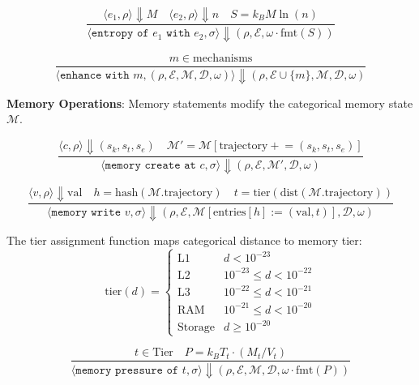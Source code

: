 \documentclass[twocolumn,10pt]{article}
\begin{document}
\begin{equation}
    \frac{\langle e_1, \rho \rangle \Downarrow M \quad \langle e_2, \rho \rangle \Downarrow n \quad S = k_B M \ln(n)}{\langle \texttt{entropy of } e_1 \texttt{ with } e_2, \sigma \rangle \Downarrow (\rho, \mathcal{E}, \omega \cdot \text{fmt}(S))}
\end{equation}

\begin{equation}
    \frac{m \in \text{mechanisms}}{\langle \texttt{enhance with } m, (\rho, \mathcal{E}, \mathcal{M}, \mathcal{D}, \omega) \rangle \Downarrow (\rho, \mathcal{E} \cup \{m\}, \mathcal{M}, \mathcal{D}, \omega)}
\end{equation}

\textbf{Memory Operations}: Memory statements modify the categorical memory state $\mathcal{M}$.

\begin{equation}
    \frac{\langle c, \rho \rangle \Downarrow (s_k, s_t, s_e) \quad \mathcal{M}' = \mathcal{M}[\text{trajectory} \mathrel{+}= (s_k, s_t, s_e)]}{\langle \texttt{memory create at } c, \sigma \rangle \Downarrow (\rho, \mathcal{E}, \mathcal{M}', \mathcal{D}, \omega)}
\end{equation}

\begin{equation}
    \frac{\langle v, \rho \rangle \Downarrow \text{val} \quad h = \text{hash}(\mathcal{M}.\text{trajectory}) \quad t = \text{tier}(\text{dist}(\mathcal{M}.\text{trajectory}))}{\langle \texttt{memory write } v, \sigma \rangle \Downarrow (\rho, \mathcal{E}, \mathcal{M}[\text{entries}[h] := (\text{val}, t)], \mathcal{D}, \omega)}
\end{equation}

The tier assignment function maps categorical distance to memory tier:
\begin{equation}
    \text{tier}(d) = \begin{cases}
        \text{L1} & d < 10^{-23} \\
        \text{L2} & 10^{-23} \leq d < 10^{-22} \\
        \text{L3} & 10^{-22} \leq d < 10^{-21} \\
        \text{RAM} & 10^{-21} \leq d < 10^{-20} \\
        \text{Storage} & d \geq 10^{-20}
    \end{cases}
\end{equation}

\begin{equation}
    \frac{t \in \text{Tier} \quad P = k_B T_t \cdot (M_t / V_t)}{\langle \texttt{memory pressure of } t, \sigma \rangle \Downarrow (\rho, \mathcal{E}, \mathcal{M}, \mathcal{D}, \omega \cdot \text{fmt}(P))}
\end{equation}
\end{document}
